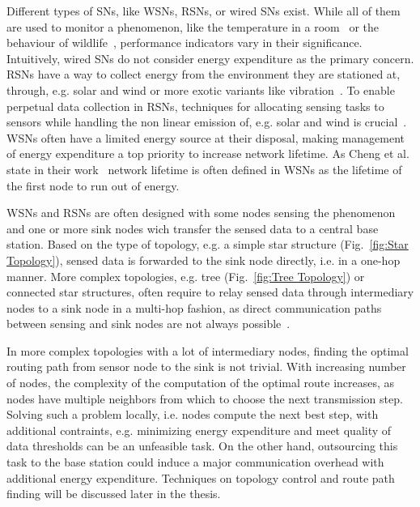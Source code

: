 Different types of \acp{SN}, like \acp{WSN}, \acp{RSN}, or wired \acp{SN}
exist. While all of them are used to monitor a phenomenon, like the temperature
in a room~\cite{labdata} or the behaviour of
wildlife~\cite{bennett2011cranetracker}, performance indicators vary in their
significance. Intuitively, wired \acp{SN} do not consider energy expenditure as
the primary concern. \acp{RSN} have a way to collect energy from the
environment they are stationed at, through, e.g. solar and wind or more exotic
variants like vibration~\cite{perpetuum}. To enable perpetual data collection
in \acp{RSN}, techniques for allocating sensing tasks to sensors while handling
the non linear emission of, e.g. solar and wind is
crucial~\cite{liu2011perpetual}. \acp{WSN} often have a limited energy source
at their disposal, making management of energy expenditure a top priority to
increase network lifetime. As Cheng et al. state in their
work~\cite{cheng2013stcdg} network lifetime is often defined in \acp{WSN} as
the lifetime of the first node to run out of energy. 
\par
\acp{WSN} and \acp{RSN} are often designed with some nodes sensing the
phenomenon and one or more sink nodes wich transfer the sensed data to a
central base station. Based on the type of topology, e.g. a simple star
structure (Fig.~\ref{fig:Star Topology}), sensed data is forwarded to the sink
node directly, i.e. in a one-hop manner. More complex topologies, e.g. tree
(Fig.~\ref{fig:Tree Topology}) or connected star structures, often require to
relay sensed data through intermediary nodes to a sink node in a multi-hop
fashion, as direct communication paths between sensing and sink nodes are not
always possible~\cite{romer2004design}. 
\par
In more complex topologies with a lot of intermediary nodes, finding the
optimal routing path from sensor node to the sink is not trivial. With
increasing number of nodes, the complexity of the computation of the optimal
route increases, as nodes have multiple neighbors from which to choose the next
transmission step. Solving such a problem locally, i.e. nodes compute the next
best step, with additional contraints, e.g. minimizing energy expenditure and
meet quality of data thresholds can be an unfeasible task. On the other hand,
outsourcing this task to the base station could induce a major communication
overhead with additional energy expenditure. Techniques on topology control
and route path finding will be discussed later in the thesis.


